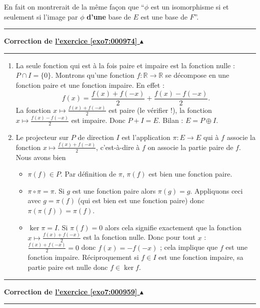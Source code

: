 \documentclass[11pt,a4paper]{article}
\newcommand{\Rr}{\mathbb{R}} \newcommand{\R}{\mathbb{R}}
\newcounter{exo}
\newcommand{\correction}[1]{\hypertarget{cor7:#1}{}\label{cor7:#1}{\bf Correction de \hyperlink{exo7:#1}{l'exercice \ref{exo7:#1} $\blacktriangle$}}\vspace{1mm}\hrule\vspace{1mm}}
\newcommand{\fincorrection}{\vspace{1mm}\hrule\vspace*{7mm}}
\begin{document}
En fait on montrerait de la même façon que ``$\phi $  est un isomorphisme si et seulement si l'image par 
$\phi $  \textbf{d'une} base de  $E$  est une base de  $F$''.
\fincorrection
\correction{000974}
\begin{enumerate}
  \item La seule fonction qui est \`a la fois paire et impaire est la fonction nulle : $P\cap I = \{0\}$. Montrons qu'une fonction $f:\Rr \longrightarrow \Rr$ se d\'ecompose en une fonction paire et une fonction impaire. 
En effet : 
 $$f(x)= \frac{f(x)+f(-x)}{2}+\frac{f(x)-f(-x)}{2}.$$
La fonction $x \mapsto \frac{f(x)+f(-x)}{2}$ est paire (le v\'erifier !),
la fonction $x \mapsto \frac{f(x)-f(-x)}{2}$ est impaire.
Donc $P+I=E$.
Bilan : $E=P\oplus I.$
  \item Le projecteur sur $P$ de direction $I$ est l'application $\pi : E \longrightarrow E$
    qui \`a $f$ associe la fonction $x \mapsto \frac{f(x)+f(-x)}{2}$, c'est-à-dire à $f$ on associe la partie paire
 de $f$.
Nous avons bien 
\begin{itemize}
  \item $\pi(f)\in P$. Par définition de $\pi$, $\pi(f)$ est bien une fonction paire.
  \item $\pi \circ \pi = \pi$. Si $g$ est une fonction paire alors $\pi(g)=g$. 
Appliquons ceci avec $g=\pi(f)$ (qui est bien est une fonction paire) donc $\pi(\pi(f))=\pi(f)$. 
  \item $\ker \pi = I$. Si $\pi(f)=0$ alors cela signifie exactement que la fonction $x \mapsto \frac{f(x)+f(-x)}{2}$
est la fonction nulle. Donc pour tout $x$ : $\frac{f(x)+f(-x)}{2}=0$ donc $f(x)=-f(-x)$ ; 
cela implique que $f$ est une fonction impaire. Réciproquement si $f\in I$ est une fonction impaire, 
sa partie paire est nulle donc $f\in \ker f$.
\end{itemize}

\end{enumerate}
\fincorrection
\correction{000959}
\end{document}
